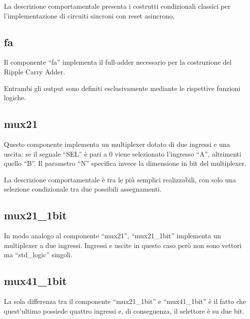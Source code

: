 \documentclass [11pt,a4paper,oneside,draft]{article}
\begin{document}


La descrizione comportamentale presenta i costrutti condizionali
classici per l'implementazione di circuiti sincroni con reset asincrono.



\subsection{fa}

Il componente ``fa'' implementa il full-adder necessario per la
costruzione del Ripple Carry Adder.



Entrambi gli output sono definiti esclusivamente mediante le
rispettive funzioni logiche.



\subsection{mux21}

Questo componente implementa un multiplexer dotato di due ingressi e una
uscita: se il segnale ``SEL'' è pari a 0 viene selezionato l'ingresso
``A'', altrimenti quello ``B''.
Il parametro ``N'' specifica invece la dimensione in bit del multiplexer.



La descrizione comportamentale è tra le più semplici realizzabili, con solo
una selezione condizionale tra due possibili assegnamenti.



\subsection{mux21\_1bit}

In modo analogo al componente ``mux21'', ``mux21\_1bit'' implementa un
multiplexer a due ingressi. Ingressi e uscite in questo caso però non sono 
vettori ma ``std\_logic'' singoli.



\subsection{mux41\_1bit}

La sola differenza tra il componente  ``mux21\_1bit'' e
``mux41\_1bit'' è il fatto che quest'ultimo possiede quattro ingressi e,
di conseguenza, il selettore è su due bit.


\end{document}
